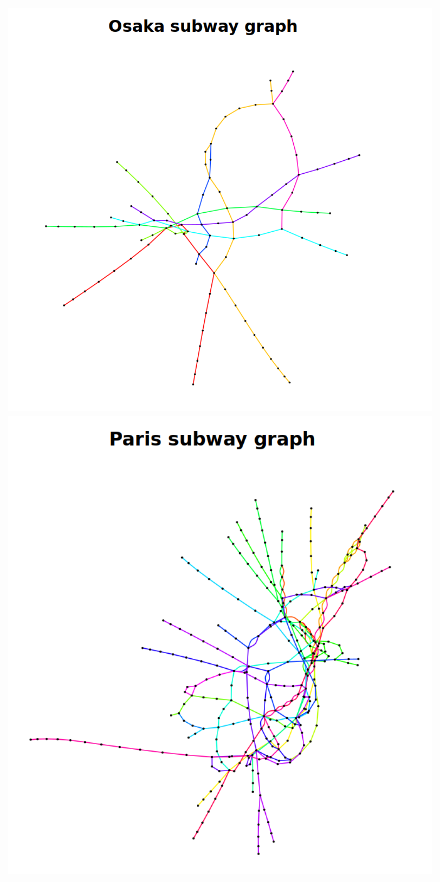 \begin{figure}[!htb]
\begin{minipage}[b]{0.24\textwidth}
    \end{minipage}
    
    \vspace{0cm} %

    \begin{minipage}[b]{0.24\textwidth}
        \includegraphics[width=\textwidth]{images/CityGraph_Osaka.png}
 
    \end{minipage}
    \hfill
    \begin{minipage}[b]{0.24\textwidth}
        \includegraphics[width=\textwidth]{images/CityGraph_Paris.png}


\end{minipage}
\end{figure}
